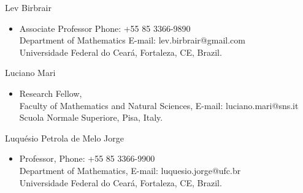 \documentclass[10pt]{article}
\newenvironment{innerlist}[1][\enskip\textbullet]%
        {\begin{itemize}[#1,leftmargin=*,parsep=0pt,itemsep=0pt,topsep=0pt,partopsep=0pt]}
        {\end{itemize}}
\newcommand{\halfblankline}{\quad\vspace{-0.5\baselineskip}\pagebreak[3]}
\begin{document}
\halfblankline

Lev Birbrair
\begin{innerlist}
\item[] Associate Professor \hfill {Phone: +55 85 3366-9890}\\
Department of Mathematics \hfill{E-mail: lev.birbrair@gmail.com}\\
Universidade Federal do Cear\'a, Fortaleza, CE, Brazil. 
\end{innerlist}

\halfblankline

Luciano Mari 
\begin{innerlist}
\item[] Research Fellow, \hfill \\
Faculty of Mathematics and Natural Sciences, \hfill{E-mail: luciano.mari@sns.it}\\
Scuola Normale Superiore, Pisa, Italy.
\end{innerlist}
\halfblankline


Luqu\'esio Petrola de Melo Jorge
\begin{innerlist}
\item[] Professor, \hfill {Phone: +55 85 3366-9900}\\
Department of Mathematics, \hfill{E-mail: luquesio.jorge@ufc.br}\\
Universidade Federal do Cear\'a, Fortaleza, CE, Brazil.
\end{innerlist}
\end{document}
